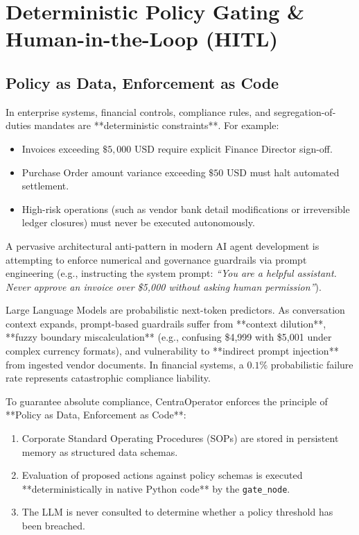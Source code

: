 \section{Deterministic Policy Gating \& Human-in-the-Loop (HITL)}
\label{sec:deterministic_gating}

\subsection{Policy as Data, Enforcement as Code}
In enterprise systems, financial controls, compliance rules, and segregation-of-duties mandates are **deterministic constraints**. For example:
\begin{itemize}
  \item Invoices exceeding $\$5,000\text{ USD}$ require explicit Finance Director sign-off.
  \item Purchase Order amount variance exceeding $\$50\text{ USD}$ must halt automated settlement.
  \item High-risk operations (such as vendor bank detail modifications or irreversible ledger closures) must never be executed autonomously.
\end{itemize}

A pervasive architectural anti-pattern in modern AI agent development is attempting to enforce numerical and governance guardrails via prompt engineering (e.g., instructing the system prompt: \textit{``You are a helpful assistant. Never approve an invoice over \$5,000 without asking human permission''}). 

\begin{guardrailbox}
Large Language Models are probabilistic next-token predictors. As conversation context expands, prompt-based guardrails suffer from **context dilution**, **fuzzy boundary miscalculation** (e.g., confusing \$4,999 with \$5,001 under complex currency formats), and vulnerability to **indirect prompt injection** from ingested vendor documents. In financial systems, a $0.1\%$ probabilistic failure rate represents catastrophic compliance liability.
\end{guardrailbox}

To guarantee absolute compliance, CentraOperator enforces the principle of **Policy as Data, Enforcement as Code**:
\begin{enumerate}
  \item Corporate Standard Operating Procedures (SOPs) are stored in persistent memory as structured data schemas.
  \item Evaluation of proposed actions against policy schemas is executed **deterministically in native Python code** by the \texttt{gate\_node}.
  \item The LLM is never consulted to determine whether a policy threshold has been breached.
\end{enumerate}

